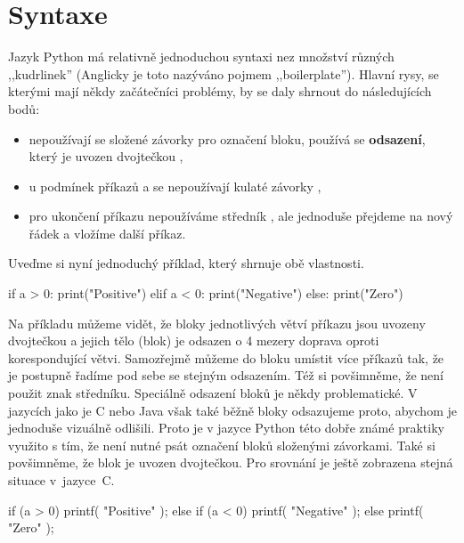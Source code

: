 \section{Syntaxe} \label{sec:syntax}

Jazyk Python má relativně jednoduchou syntaxi nez množství různých ,,kudrlinek'' (Anglicky je toto nazýváno pojmem
,,boilerplate''). Hlavní rysy, se kterými mají někdy začátečníci problémy, by se daly shrnout do následujících bodů:

\begin{itemize}
    \item nepoužívají se složené závorky \kod{\{} \kod{\}} pro označení bloku,
          používá se \textbf{odsazení}, který je uvozen dvojtečkou \kod{:},
    \item u podmínek příkazů  a  se nepoužívají kulaté závorky \kod{(} \kod{)},
    \item pro ukončení příkazu nepoužíváme středník \kod{;}, ale jednoduše přejdeme na nový řádek a vložíme další příkaz.
\end{itemize}

Uveďme si nyní jednoduchý příklad, který shrnuje obě vlastnosti.

\begin{python}
if a > 0:
    print("Positive")
elif a < 0:
    print("Negative")
else:
    print("Zero")
\end{python}
Na příkladu můžeme vidět, že bloky jednotlivých větví příkazu  jsou uvozeny dvojtečkou a jejich tělo (blok) je
odsazen o 4 mezery doprava oproti korespondující větvi. Samozřejmě můžeme do bloku umístit více příkazů tak, že
je postupně řadíme pod sebe se stejným odsazením. Též si povšimněme, že není použit znak středníku.
Speciálně odsazení bloků je někdy problematické. V jazycích jako je C nebo Java však také běžně bloky odsazujeme
proto, abychom je jednoduše vizuálně odlišili. Proto je v jazyce Python této dobře známé praktiky využito s tím,
že není nutné psát označení bloků složenými závorkami. Také si povšimněme, že blok je uvozen dvojtečkou.
Pro srovnání je ještě zobrazena stejná situace v~jazyce~C.

\begin{python}
if (a > 0) {
    printf( "Positive\n" );
}
else if (a < 0) {
    printf( "Negative\n" );
}
else {
    printf( "Zero\n" );
}
\end{python}

